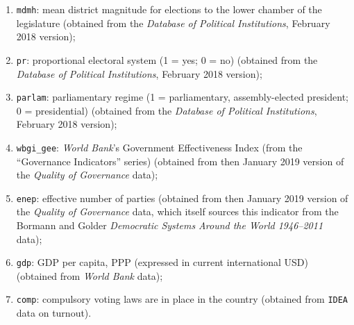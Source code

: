 \documentclass[12pt,english]{article}
\begin{document}
\begin{enumerate}
  \item \texttt{mdmh}: mean district magnitude for elections to the lower chamber of the legislature (obtained from the \textit{Database of Political Institutions}, February 2018 version);
  \item \texttt{pr}: proportional electoral system (1 = yes; 0 = no) (obtained from the \textit{Database of Political Institutions}, February 2018 version);
  \item \texttt{parlam}: parliamentary regime (1 = parliamentary, assembly-elected president; 0 = presidential) (obtained from the \textit{Database of Political Institutions}, February 2018 version);
  \item \texttt{wbgi\_gee}: \textit{World Bank}'s Government Effectiveness Index (from the ``Governance Indicators'' series) (obtained from then January 2019 version of the \textit{Quality of Governance} data);
  \item \texttt{enep}: effective number of parties (obtained from then January 2019 version of the \textit{Quality of Governance} data, which itself sources this indicator from the Bormann and Golder \textit{Democratic Systems Around the World 1946--2011} data);
  \item \texttt{gdp}: GDP per capita, PPP (expressed in current international USD) (obtained from \textit{World Bank} data);
  \item \texttt{comp}: compulsory voting laws are in place in the country (obtained from \texttt{IDEA} data on turnout).
\end{enumerate}
\end{document}
